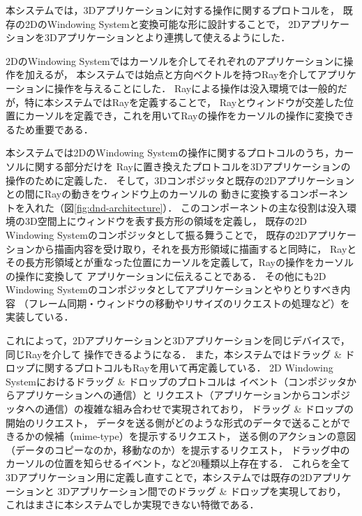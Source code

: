 
本システムでは，3Dアプリケーションに対する操作に関するプロトコルを，
既存の2DのWindowing Systemと変換可能な形に設計することで，
2Dアプリケーションを3Dアプリケーションとより連携して使えるようにした．

2DのWindowing Systemではカーソルを介してそれぞれのアプリケーションに操作を加えるが，
本システムでは始点と方向ベクトルを持つRayを介してアプリケーションに操作を与えることにした．
Rayによる操作は没入環境では一般的だが，特に本システムではRayを定義することで，
Rayとウィンドウが交差した位置にカーソルを定義でき，これを用いてRayの操作をカーソルの操作に変換できるため重要である．

本システムでは2DのWindowing Systemの操作に関するプロトコルのうち，カーソルに関する部分だけを
Rayに置き換えたプロトコルを3Dアプリケーションの操作のために定義した．
そして，3Dコンポジッタと既存の2Dアプリケーションとの間にRayの動きをウィンドウ上のカーソルの
動きに変換するコンポーネントを入れた（図\ref{fig:dnd-architecture}）．
このコンポーネントの主な役割は没入環境の3D空間上にウィンドウを表す長方形の領域を定義し，
既存の2D Windowing Systemのコンポジッタとして振る舞うことで，
既存の2Dアプリケーションから描画内容を受け取り，それを長方形領域に描画すると同時に，
Rayとその長方形領域とが重なった位置にカーソルを定義して，Rayの操作をカーソルの操作に変換して
アプリケーションに伝えることである．
その他にも2D Windowing Systemのコンポジッタとしてアプリケーションとやりとりすべき内容
（フレーム同期・ウィンドウの移動やリサイズのリクエストの処理など）を実装している．

これによって，2Dアプリケーションと3Dアプリケーションを同じデバイスで，同じRayを介して
操作できるようになる．
また，本システムではドラッグ \& ドロップに関するプロトコルもRayを用いて再定義している．
2D Windowing Systemにおけるドラッグ \& ドロップのプロトコルは
イベント（コンポジッタからアプリケーションへの通信）と
リクエスト（アプリケーションからコンポジッタへの通信）の複雑な組み合わせで実現されており，
ドラッグ \& ドロップの開始のリクエスト，
データを送る側がどのような形式のデータで送ることができるかの候補（mime-type）を提示するリクエスト，
送る側のアクションの意図（データのコピーなのか，移動なのか）を提示するリクエスト，
ドラッグ中のカーソルの位置を知らせるイベント，など20種類以上存在する．
これらを全て3Dアプリケーション用に定義し直すことで，本システムでは既存の2Dアプリケーションと
3Dアプリケーション間でのドラッグ \& ドロップを実現しており，
これはまさに本システムでしか実現できない特徴である．


